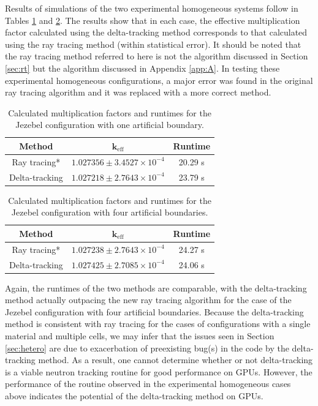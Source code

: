 Results of simulations of the two experimental homogeneous systems follow in Tables 
\ref{jezebel_shells_table} and \ref{jezebel_five_table}. The results show that in each case, the
effective multiplication factor calculated using the delta-tracking method corresponds to that calculated
using the ray tracing method (within statistical error). It should be noted that the ray tracing method
referred to here is not the algorithm discussed in Section \ref{sec:rt} but the algorithm discussed in
Appendix \ref{app:A}. In testing these experimental homogeneous configurations, a major error was found
in the original ray tracing algorithm and it was replaced with a more correct method.

\begin{table}[h!]
\centering
\caption{Calculated multiplication factors and runtimes for the Jezebel configuration with one 
artificial boundary.}
\label{jezebel_shells_table}
\begin{tabular}{| c | c | c |}
\hline
\textbf{Method} & $\mathbf{k_{\mathrm{eff}}}$ & \textbf{Runtime} \\
\hline
Ray tracing* & $1.027356 \pm 3.4527 \times 10^{-4}$ & 20.29 s \\
Delta-tracking & $1.027218 \pm 2.7643 \times 10^{-4}$ & 23.79 s \\
\hline
\end{tabular}
\end{table}

\begin{table}[h!]
\centering
\caption{Calculated multiplication factors and runtimes for the Jezebel configuration with four 
artificial boundaries.}
\label{jezebel_five_table}
\begin{tabular}{| c | c | c |}
\hline
\textbf{Method} & $\mathbf{k_{\mathrm{eff}}}$ & \textbf{Runtime} \\
\hline
Ray tracing* & $1.027238 \pm 2.7643 \times 10^{-4}$ & 24.27 s \\
Delta-tracking & $1.027425 \pm 2.7085 \times 10^{-4}$ & 24.06 s \\
\hline
\end{tabular}
\end{table}

Again, the runtimes of the two methods are comparable, with the delta-tracking method actually outpacing
the new ray tracing algorithm for the case of the Jezebel configuration with four artificial boundaries.
Because the delta-tracking method is consistent with ray tracing for the cases of configurations with a
single material and multiple cells, we may infer that the issues seen in Section \ref{sec:hetero} are due
to exacerbation of preexisting bug(s) in the code by the delta-tracking method. As a result, one cannot
determine whether or not delta-tracking is a viable neutron tracking routine for good performance on GPUs.
However, the performance of the routine observed in the experimental homogeneous cases above indicates the
potential of the delta-tracking method on GPUs.
